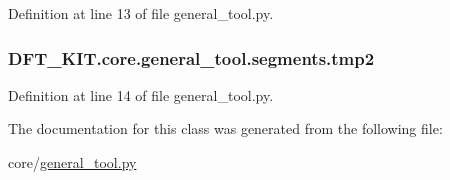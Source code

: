 Definition at line 13 of file general\+\_\+tool.\+py.

\hypertarget{class_d_f_t___k_i_t_1_1core_1_1general__tool_1_1segments_ab34ef602f88d29a1fa594154e1ed9d5d}{
\subsubsection[{tmp2}]{\setlength{\rightskip}{0pt plus 5cm}D\+F\+T\+\_\+\+K\+I\+T.\+core.\+general\+\_\+tool.\+segments.\+tmp2}}\label{class_d_f_t___k_i_t_1_1core_1_1general__tool_1_1segments_ab34ef602f88d29a1fa594154e1ed9d5d}


Definition at line 14 of file general\+\_\+tool.\+py.



The documentation for this class was generated from the following file\+:\begin{DoxyCompactItemize}
\item 
core/\hyperlink{general__tool_8py}{general\+\_\+tool.\+py}\end{DoxyCompactItemize}
